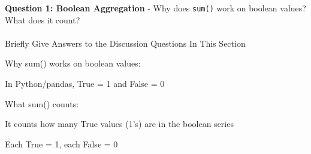 \documentclass[
  letterpaper,
  DIV=11,
  numbers=noendperiod]{scrartcl}
\makeatletter
\let\oldparagraph\paragraph
\renewcommand{\paragraph}{
    \@ifstar
      \xxxParagraphStar
      \xxxParagraphNoStar
  }
\newcommand{\xxxParagraphStar}[1]{\oldparagraph*{#1}\mbox{}}
\newcommand{\xxxParagraphNoStar}[1]{\oldparagraph{#1}\mbox{}}
\makeatother
\begin{document}
\begin{tcolorbox}[enhanced jigsaw, toptitle=1mm, opacityback=0, colframe=quarto-callout-important-color-frame, leftrule=.75mm, arc=.35mm, opacitybacktitle=0.6, breakable, titlerule=0mm, coltitle=black, bottomtitle=1mm, title=\textcolor{quarto-callout-important-color}{\faExclamation}\hspace{0.5em}{🤔 Discussion Questions: Aggregate Mental Model}, colbacktitle=quarto-callout-important-color!10!white, rightrule=.15mm, left=2mm, bottomrule=.15mm, toprule=.15mm, colback=white]

\textbf{Question 1: Boolean Aggregation} - Why does \texttt{sum()} work
on boolean values? What does it count?

\end{tcolorbox}

\paragraph{Briefly Give Answers to the Discussion Questions In This
Section}\label{briefly-give-answers-to-the-discussion-questions-in-this-section-4}

Why sum() works on boolean values:

In Python/pandas, True = 1 and False = 0

What sum() counts:

It counts how many True values (1's) are in the boolean series

Each True = 1, each False = 0
\end{document}
